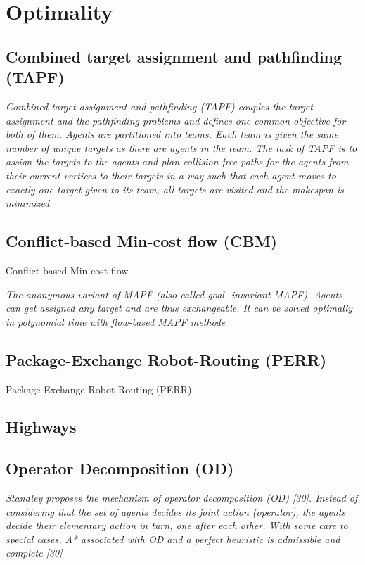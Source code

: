 \documentclass[a4paper,11pt]{article}
\begin{document}





\section{Optimality}


\subsection{Combined target assignment and pathfinding (TAPF)}

\textit{Combined target assignment and pathfinding (TAPF) couples the target-assignment and the pathfinding problems and defines one common objective for both of them. Agents are partitioned into teams.
Each team is given the same number of unique targets as there are agents in the team. The task of TAPF is to assign the targets to the agents and plan collision-free paths for the agents from their current vertices to their targets in a way such that each agent moves to exactly one target given to its team, all targets are visited and the makespan is minimized}

\subsection{Conflict-based Min-cost flow (CBM)}
Conflict-based Min-cost flow

\textit{The anonymous variant of MAPF (also called goal- invariant MAPF). Agents can get assigned any target and are thus exchangeable. It can be solved optimally in polynomial time with flow-based MAPF methods}

\subsection{Package-Exchange Robot-Routing (PERR)}
Package-Exchange Robot-Routing (PERR)

\subsection{Highways}
\cite{cohen2016bounded}

\subsection{Operator Decomposition (OD)}
\textit{Standley proposes the mechanism of operator decomposition (OD) [30]. Instead of considering that the set of agents decides its joint action (operator), the agents decide their elementary action in turn, one after each other. With some care to special cases, A* associated with OD and a perfect heuristic is admissible and complete [30]}
\end{document}
